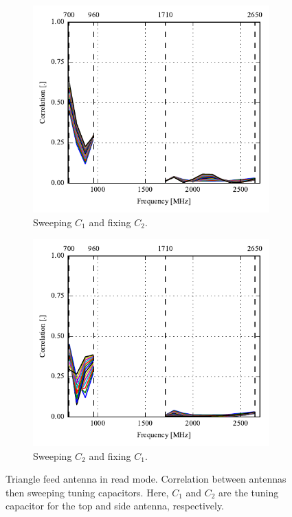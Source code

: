 \begin{figure}[htbp]
    \centering
    \begin{subfigure}{0.49\linewidth}
        \includegraphics{img/tech_sol/trianglefeed/read_mode/correlation_Csh1-sweep}
        \caption{Sweeping $C_1$ and fixing $C_2$.}
    \end{subfigure}
    \hfill
    \begin{subfigure}{0.49\linewidth}
        \includegraphics{img/tech_sol/trianglefeed/read_mode/correlation_Csh2-sweep}
        \caption{Sweeping $C_2$ and fixing $C_1$.}
    \end{subfigure}
    \caption{Triangle feed antenna in read mode. Correlation between antennas then sweeping tuning capacitors. Here, $C_1$ and $C_2$ are the tuning capacitor for the top and side antenna, respectively.}
    \label{fig:corr_sol2_read}
\end{figure}

